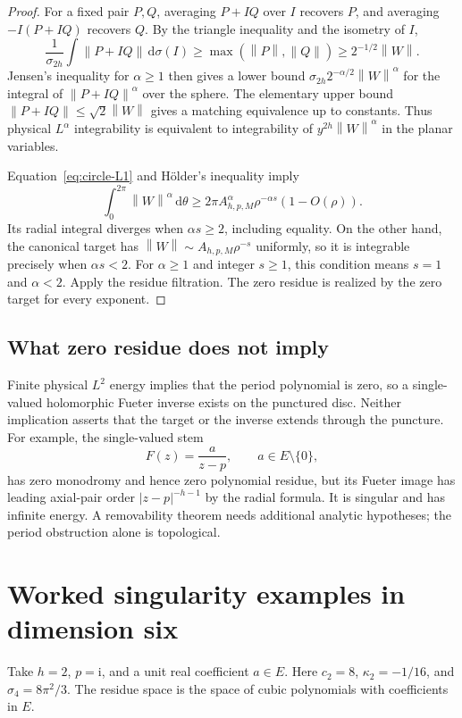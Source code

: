 \documentclass[11pt,a4paper]{article}
\numberwithin{equation}{section}
\theoremstyle{definition}
\theoremstyle{remark}
\newcommand{\ii}{\mathrm i}
\newcommand{\dd}{\,\mathrm d}
\newcommand{\norm}[1]{\left\lVert#1\right\rVert}
\newcommand{\sig}{\sigma_{2h}}
\begin{document}
\begin{proof}
For a fixed pair $P,Q$, averaging $P+IQ$ over $I$ recovers $P$, and averaging
$-I(P+IQ)$ recovers $Q$. By the triangle inequality and the isometry of $I$,
\[
 \frac1{\sig}\int\norm{P+IQ}\dd\sigma(I)
 \ge\max(\norm P,\norm Q)\ge2^{-1/2}\norm W.
\]
Jensen's inequality for $\alpha\ge1$ then gives a lower bound
$\sig 2^{-\alpha/2}\norm W^\alpha$ for the integral of
$\norm{P+IQ}^\alpha$ over the sphere. The elementary upper bound
$\norm{P+IQ}\le\sqrt2\norm W$ gives a matching equivalence up to constants.
Thus physical $L^\alpha$ integrability is equivalent to integrability of
$y^{2h}\norm W^\alpha$ in the planar variables.

Equation~\eqref{eq:circle-L1} and H\"older's inequality imply
\[
 \int_0^{2\pi}\norm W^\alpha\dd\theta
 \ge2\pi A_{h,p,M}^{\alpha}\rho^{-\alpha s}(1-O(\rho)).
\]
Its radial integral diverges when $\alpha s\ge2$, including equality. On the
other hand, the canonical target has $\norm W\sim A_{h,p,M}\rho^{-s}$
uniformly, so it is integrable precisely when $\alpha s<2$.
For $\alpha\ge1$ and integer $s\ge1$, this condition means $s=1$ and
$\alpha<2$. Apply the residue filtration. The zero residue is realized by
the zero target for every exponent.
\end{proof}

\subsection{What zero residue does not imply}

Finite physical $L^2$ energy implies that the period polynomial is zero, so
a single-valued holomorphic Fueter inverse exists on the punctured disc.
Neither implication asserts that the target or the inverse extends through
the puncture. For example, the single-valued stem
\[
 F(z)=\frac{a}{z-p},\qquad a\in E\setminus\{0\},
\]
has zero monodromy and hence zero polynomial residue, but its Fueter image
has leading axial-pair order $|z-p|^{-h-1}$ by the radial formula. It is
singular and has infinite energy. A removability theorem needs additional
analytic hypotheses; the period obstruction alone is topological.

\section{Worked singularity examples in dimension six}
\label{sec:examples}

Take $h=2$, $p=\ii$, and a unit real coefficient $a\in E$. Here $c_2=8$,
$\kappa_2=-1/16$, and $\sigma_4=8\pi^2/3$. The residue space is the space
of cubic polynomials with coefficients in $E$.
\end{document}
